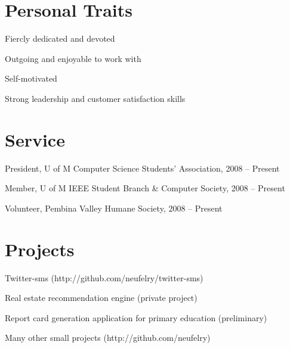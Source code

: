 \documentclass[margin,line,letterpaper]{resume}
\begin{document}
\begin{resume}
  \section{\mysidestyle Personal Traits}

  \begin{list2}
    \item Fiercly dedicated and devoted
    \item Outgoing and enjoyable to work with
    \item Self-motivated
    \item Strong leadership and customer satisfaction skills
  \end{list2}

  \section{\mysidestyle Service}

  \begin{list2}
    \item President, U of M Computer Science Students' Association, 2008 -- Present
    \item Member, U of M IEEE Student Branch \& Computer Society, 2008 -- Present
    \item Volunteer, Pembina Valley Humane Society, 2008 -- Present
  \end{list2}

  \newpage
  \section{\mysidestyle Projects}

  \begin{list2}
    \item Twitter-sms (http://github.com/neufelry/twitter-sms)
    \item Real estate recommendation engine (private project)
    \item Report card generation application for primary education (preliminary)
    \item Many other small projects (http://github.com/neufelry)
  \end{list2}



\end{resume}
\end{document}
